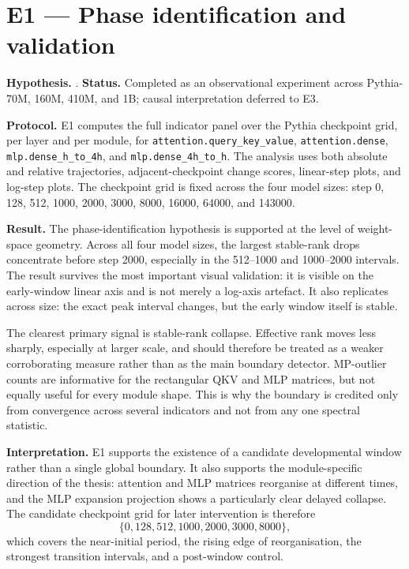 \section{E1 --- Phase identification and validation}
\label{sec:res-e1}

\noindent\textbf{Hypothesis.} . \quad\textbf{Status.} Completed as an
observational experiment across Pythia-70M, 160M, 410M, and 1B; causal interpretation deferred to
E3.

\noindent\textbf{Protocol.} E1 computes the full indicator panel over the Pythia checkpoint grid,
per layer and per module, for \texttt{attention.query\_key\_value}, \texttt{attention.dense},
\texttt{mlp.dense\_h\_to\_4h}, and \texttt{mlp.dense\_4h\_to\_h}. The analysis uses both absolute
and relative trajectories, adjacent-checkpoint change scores, linear-step plots, and log-step plots.
The checkpoint grid is fixed across the four model sizes: step 0, 128, 512, 1000, 2000, 3000, 8000,
16000, 64000, and 143000.

\noindent\textbf{Result.} The phase-identification hypothesis is supported at the level of
weight-space geometry. Across all four model sizes, the largest stable-rank drops concentrate before
step 2000, especially in the 512--1000 and 1000--2000 intervals. The result survives the most
important visual validation: it is visible on the early-window linear axis and is not merely a
log-axis artefact. It also replicates across size: the exact peak interval changes, but the early
window itself is stable.

The clearest primary signal is stable-rank collapse. Effective rank moves less sharply, especially
at larger scale, and should therefore be treated as a weaker corroborating measure rather than as
the main boundary detector. MP-outlier counts are informative for the rectangular QKV and MLP
matrices, but not equally useful for every module shape. This is why the boundary is credited only
from convergence across several indicators and not from any one spectral statistic.

\noindent\textbf{Interpretation.} E1 supports the existence of a candidate developmental window
rather than a single global boundary. It also supports the module-specific direction of the thesis:
attention and MLP matrices reorganise at different times, and the MLP expansion projection shows a
particularly clear delayed collapse. The candidate checkpoint grid for later intervention is
therefore
\[
  \{0, 128, 512, 1000, 2000, 3000, 8000\},
\]
which covers the near-initial period, the rising edge of reorganisation, the strongest transition
intervals, and a post-window control.

